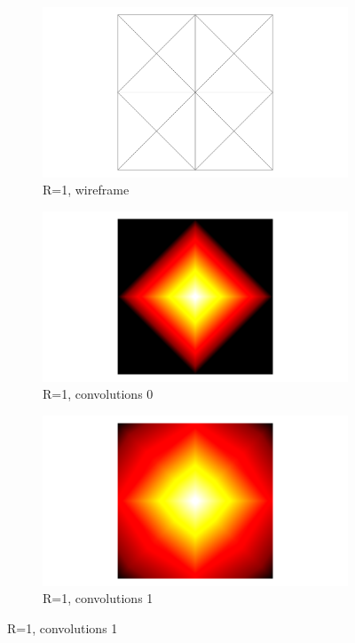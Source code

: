 \begin{figure}[ht]
	\begin{subfigure}[b]{0.32\linewidth}
		\includegraphics[width=\linewidth]
		{data/synthetic_meshes/square_tesselation_4tri_Dirac_delta_1_v13_f16_wireframe.png}
		\caption{R=1, wireframe}\label{fig:sq2.a}
	\end{subfigure}
	\begin{subfigure}[b]{0.32\linewidth}
		\includegraphics[width=\linewidth]
		{data/synthetic_meshes/square_tesselation_4tri_Dirac_delta_1_v13_f16_funcvals_0iter.png}
		\caption{R=1, convolutions 0}\label{fig:sq2.b}
	\end{subfigure}
	\begin{subfigure}[b]{0.32\linewidth}
		\includegraphics[width=\linewidth]
		{data/synthetic_meshes/square_tesselation_4tri_Dirac_delta_1_v13_f16_funcvals_1iter.png}
		\caption{R=1, convolutions 1}\label{fig:sq2.c}
	\end{subfigure}


\end{figure}

